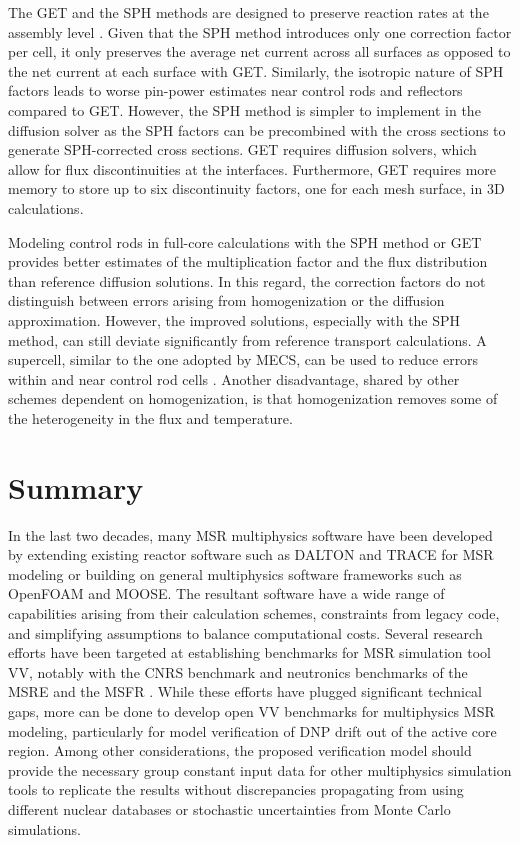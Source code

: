 The \gls{GET} and the \gls{SPH} methods are designed to preserve reaction rates at the assembly
level \cite{yamamoto_cell_2004}. Given that the \gls{SPH} method introduces only one correction
factor per cell, it only preserves the average net current across all surfaces as opposed
to the net current at each surface with \gls{GET}. Similarly, the isotropic nature of \gls{SPH}
factors leads to worse pin-power estimates near control rods and reflectors compared to \gls{GET}.
However, the \gls{SPH} method is simpler to implement in the diffusion solver as the \gls{SPH}
factors can be precombined with the cross sections to generate \gls{SPH}-corrected cross sections.
\gls{GET} requires diffusion solvers, which allow for flux discontinuities at the interfaces.
Furthermore, \gls{GET} requires more memory to store up to six discontinuity factors, one for each
mesh surface, in 3D calculations.

Modeling control rods in full-core calculations with the \gls{SPH} method or \gls{GET} provides
better estimates of the multiplication factor and the flux distribution than reference diffusion
solutions. In this regard, the correction factors do not distinguish between errors arising from
homogenization or the diffusion approximation. However, the improved solutions, especially with the
\gls{SPH} method, can still deviate significantly from reference transport calculations. A
supercell, similar to the one adopted by \gls{MECS}, can be used to reduce errors within and near
control rod cells \cite{ortensi_newton_2018}. Another disadvantage, shared by other schemes
dependent on homogenization, is that homogenization removes some of the heterogeneity in the flux
and temperature.

\section{Summary}

In the last two decades, many \gls{MSR} multiphysics software have been developed by
extending existing reactor software such as DALTON and \gls{TRACE} for \gls{MSR} modeling or
building on general multiphysics software frameworks such as OpenFOAM and \gls{MOOSE}. The
resultant software have a wide range of capabilities arising from their calculation schemes,
constraints from legacy code, and simplifying assumptions to balance computational costs. Several
research efforts have been targeted at establishing benchmarks for \gls{MSR} simulation tool
\gls{VV}, notably with the CNRS benchmark \cite{tiberga_results_2020} and neutronics benchmarks of
the \gls{MSRE} \cite{fratoni_molten_2020} and the \gls{MSFR} \cite{brovchenko_neutronic_2019}.
While these efforts have plugged significant technical gaps, more can be done to develop open
\gls{VV} benchmarks for multiphysics \gls{MSR} modeling, particularly for model verification of
\gls{DNP} drift out of the active core region. Among other considerations, the proposed
verification model should provide the necessary group constant input data for other multiphysics
simulation tools to replicate the results without discrepancies propagating from using different
nuclear databases or stochastic uncertainties from Monte Carlo simulations.

